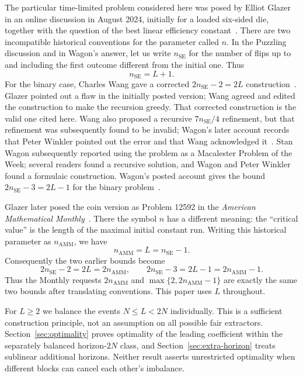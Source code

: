 \documentclass[11pt]{article}
\theoremstyle{definition}
\theoremstyle{remark}
\begin{document}
The particular time-limited problem considered here was posed by Elliot
Glazer in an online discussion in August 2024, initially for a loaded
six-sided die, together with the question of the best linear efficiency
constant~\cite{GlazerPuzzling2024}. There are two incompatible historical
conventions for the parameter called $n$. In the Puzzling discussion and in
Wagon's answer, let us write $n_{\mathrm{SE}}$ for the number of flips up to
and including the first outcome different from the initial one. Thus
\begin{equation}\label{eq:historical-notation}
 n_{\mathrm{SE}}=L+1.
\end{equation}
For the binary case, Charles Wang gave a corrected
$2n_{\mathrm{SE}}-2=2L$ construction~\cite{WangPuzzling2024}. Glazer
pointed out a flaw in the initially posted version; Wang agreed and edited
the construction to make the recursion greedy. That corrected construction
is the valid one cited here. Wang also proposed a recursive $7n_{\mathrm{SE}}/4$
refinement, but that refinement was subsequently found to be invalid;
Wagon's later account records that Peter Winkler pointed out the error and
that Wang acknowledged it~\cite{WagonPuzzling2025}. Stan Wagon subsequently
reported using the problem as a Macalester Problem of the Week; several
readers found a recursive solution, and Wagon and Peter Winkler found a
formulaic construction. Wagon's posted account gives the bound
$2n_{\mathrm{SE}}-3=2L-1$ for the binary problem~\cite{WagonPuzzling2025}.

Glazer later posed the coin version as Problem 12592 in the \emph{American
Mathematical Monthly}~\cite{GlazerAMM2026}. There the symbol $n$ has a
different meaning: the ``critical value'' is the length of the maximal
initial constant run. Writing this historical parameter as
$n_{\mathrm{AMM}}$, we have
\[
 n_{\mathrm{AMM}}=L=n_{\mathrm{SE}}-1.
\]
Consequently the two earlier bounds become
\[
 2n_{\mathrm{SE}}-2=2L=2n_{\mathrm{AMM}},
 \qquad
 2n_{\mathrm{SE}}-3=2L-1=2n_{\mathrm{AMM}}-1.
\]
Thus the Monthly requests $2n_{\mathrm{AMM}}$ and
$\max\{2,2n_{\mathrm{AMM}}-1\}$ are exactly the same two bounds after
translating conventions. This paper uses $L$ throughout.

For $L\ge2$ we balance the events $N\le L<2N$ individually. This is a
sufficient construction principle, not an assumption on all possible fair
extractors. Section~\ref{sec:optimality} proves optimality of the leading
coefficient within the separately balanced horizon-$2N$ class, and
Section~\ref{sec:extra-horizon} treats sublinear additional horizons.
Neither result asserts unrestricted optimality when different blocks can
cancel each other's imbalance.
\end{document}
